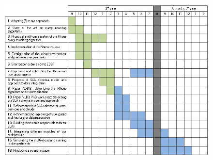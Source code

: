 \documentclass[11pt,a4paper,oneside]{report}
\begin{document}

\begin{figure}[h!]
\center
\includegraphics[scale=0.87]{calendar.png}
\end{figure}
\end{document}
